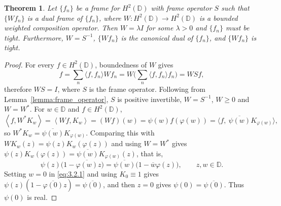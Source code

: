 \documentclass{amsart}
\newtheorem{thm}{Theorem}[section]
\theoremstyle{definition}
\theoremstyle{remark}
\numberwithin{equation}{section}
\newcommand{\ip}[2]{\left\langle {#1} , {#2} \right\rangle} %
\newcommand{\D}{\mathbb{D}} %
\begin{document}
\begin{thm}\label{no_dual}
    Let $\{f_{n}\}$ be a frame for $H^{2}(\mathbb{D})$ with frame operator $S$ such that $\{Wf_{n}\}$ is a dual frame of $\{f_{n}\}$, where $W:H^{2}(\mathbb{D})\to H^{2}(\mathbb{D})$ is a bounded weighted composition operator. Then $W= \lambda I$ for some $\lambda>0$ and $\{f_{n}\}$ must be tight. Furthermore, $W=S^{-1}$, $\{ Wf_n\}$ is the canonical dual of $\{f_{n}\}$, and $\{ Wf_n\}$ is tight.
\end{thm}
\begin{proof}
For every $f \in H^2(\D)$, boundedness of $W$ gives 
\begin{equation*}
    f = \sum_n \langle f , f_n \rangle Wf_n = W \Big( \sum_n \langle f,f_n\rangle f_n\Big) = WSf,
\end{equation*}
    therefore $WS = I$, where $S$ is the frame operator. Following from Lemma~\ref{lemma:frame_operator}, $S$ is positive invertible, $W= S^{-1}$, $W \geq 0$ and $W = W^*$. For $w\in\D$ and $f\in H^{2}(\D)$,
\[
  \ip{f}{W^{*}K_w}=\ip{Wf}{K_w}=(Wf)(w)=\psi(w)f(\varphi(w))
   =\bigl\langle f,\ \overline{\psi(w)}K_{\varphi(w)}\bigr\rangle ,
\]
so $W^{*}K_w=\overline{\psi(w)}K_{\varphi(w)}$.  Comparing this with
$WK_w(z)=\psi(z)K_w(\varphi(z))$ and using $W=W^{*}$ gives
$\psi(z)K_w(\varphi(z))=\overline{\psi(w)}K_{\varphi(w)}(z)$, that is,
\begin{equation}\label{eq:3.2.1}
  \psi(z)\bigl(1-\overline{\varphi(w)}z\bigr)
  =\overline{\psi(w)}\bigl(1-\overline{w}\varphi(z)\bigr),
  \qquad z,w\in\D .
\end{equation}
Setting $w=0$ in \eqref{eq:3.2.1} and
using $K_0\equiv1$ gives $\psi(z)(1-\overline{\varphi(0)}z)=\overline{\psi(0)}$, and
then $z=0$ gives $\psi(0)=\overline{\psi(0)}$.  Thus $\psi(0)$ is real.


\end{proof}
\end{document}
